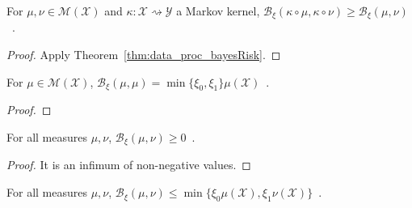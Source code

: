 \begin{theorem}
  \label{thm:data_proc_bayesBinaryRisk}
  \leanok
  For $\mu, \nu \in \mathcal M(\mathcal X)$ and $\kappa : \mathcal X \rightsquigarrow \mathcal Y$ a Markov kernel, $\mathcal B_\xi(\kappa \circ \mu, \kappa \circ \nu) \ge \mathcal B_\xi(\mu, \nu)$~.
\end{theorem}

\begin{proof}\leanok
{}
Apply Theorem~\ref{thm:data_proc_bayesRisk}.
\end{proof}


\begin{lemma}
  \label{lem:bayesBinaryRisk_self}
  \leanok
  For $\mu \in \mathcal M(\mathcal X)$, $\mathcal B_\xi(\mu, \mu) = \min\{\xi_0, \xi_1\} \mu(\mathcal X)$~.
\end{lemma}

\begin{proof}\leanok
\uses{}
\end{proof}


\begin{lemma}
  \label{lem:bayesBinaryRisk_nonneg}
  For all measures $\mu, \nu$, $\mathcal B_\xi(\mu, \nu) \ge 0$~.
\end{lemma}

\begin{proof}%
\uses{}
It is an infimum of non-negative values.
\end{proof}


\begin{lemma}
  \label{lem:bayesBinaryRisk_le}
  \leanok
  For all measures $\mu, \nu$, $\mathcal B_\xi(\mu, \nu) \le \min\{\xi_0 \mu(\mathcal X), \xi_1 \nu(\mathcal X)\}$~.
\end{lemma}

